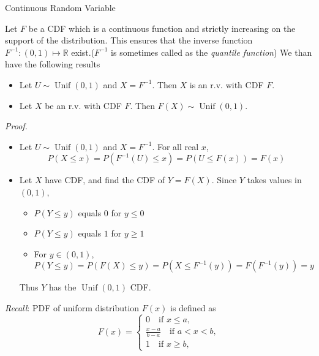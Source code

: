 \documentclass[8pt]{beamer}
\newcommand{\myunif}[2]{\operatorname{Unif}\!\left(#1, #2\right)}
\begin{document}
\begin{frame}{Continuous Random Variable}
    \begin{theorem}
        Let $F$ be a CDF which is a continuous function and strictly increasing on the support of the distribution. This ensures that the inverse function $F^{-1}: (0,1) \mapsto \mathbb{R}$ exist.($F^{-1}$ is sometimes called as the \textit{quantile function}) We than have the following results
        \begin{itemize}
            \item Let $U \sim \myunif{0}{1}$ and $X = F^{-1}$. Then $X$ is an r.v. with CDF $F$.
            \item Let $X$ be an r.v. with CDF $F$. Then $F(X) \sim \myunif{0}{1}$.
        \end{itemize}
    \end{theorem}

    \textit{Proof.}
    \begin{itemize}
        \item Let $U \sim \myunif{0}{1}$ and $X = F^{-1}$. For all real $x$,
         \[P(X \leq x) = P(F^{-1}(U)\leq x) = P(U \leq F(x)) = F(x)\]
        \item Let $X$ have CDF, and find the CDF of $Y = F(X)$. Since $Y$ takes values in $(0,1)$, 
        \begin{itemize}
            \item $P(Y\leq y)$ equals $0$ for $y \leq 0$
            \item $P(Y\leq y)$ equals $1$ for $y \geq 1$
            \item For $y \in (0,1)$, $P(Y \leq y) = P(F(X) \leq y) = P(X \leq F^{-1}(y)) = F(F^{-1}(y)) = y$
        \end{itemize}
        Thus $Y$ has the $\myunif{0}{1}$ CDF.
    \end{itemize}
    \textit{Recall}: PDF of uniform distribution $F(x)$ is defined as
    \[
        F(x) = \begin{cases}
            0 \quad \text{if } x\leq a,
            \\ \frac{x-a}{b-a} \quad \text{if } a < x <b,
            \\ 1 \quad \text{if } x \geq b,
        \end{cases}
    \]

\end{frame}
\end{document}
